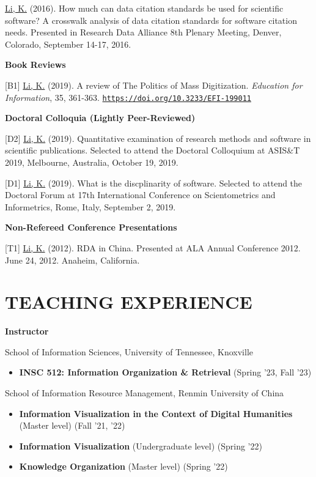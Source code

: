 \documentclass[margin, 10pt]{res} %
\begin{document}
\begin{resume}
[P1] \underline{Li, K.} (2016). How much can data citation standards be used for scientific software? A crosswalk analysis of data citation standards for software citation needs. Presented in Research Data Alliance 8th Plenary Meeting, Denver, Colorado, September 14-17, 2016.

\textbf{Book Reviews}

[B1] \underline{Li, K.} (2019). A review of The Politics of Mass Digitization. \textit{Education for Information}, 35, 361-363. \href{https://doi.org/10.3233/EFI-199011}{\nolinkurl{https://doi.org/10.3233/EFI-199011}}

\textbf{Doctoral Colloquia (Lightly Peer-Reviewed)}

[D2] \underline{Li, K.} (2019). Quantitative examination of research methods and software in scientific publications. Selected to attend the Doctoral Colloquium at ASIS\&T 2019, Melbourne, Australia, October 19, 2019.

[D1] \underline{Li, K.} (2019). What is the discplinarity of software. Selected to attend the Doctoral Forum at 17th International Conference on Scientometrics and Informetrics, Rome, Italy, September 2, 2019.

\textbf{Non-Refereed Conference Presentations}

[T1] \underline{Li, K.} (2012). RDA in China. Presented at ALA Annual Conference 2012. June 24, 2012. Anaheim, California.

\section{TEACHING EXPERIENCE}

\textbf{Instructor}

School of Information Sciences, University of Tennessee, Knoxville
\begin{itemize}
\item \textbf{INSC 512: Information Organization \& Retrieval} (Spring '23, Fall '23)
\end{itemize}

School of Information Resource Management, Renmin University of China
\begin{itemize}
\item \textbf{Information Visualization in the Context of Digital Humanities} (Master level) (Fall '21, '22)
\item \textbf{Information Visualization} (Undergraduate level) (Spring '22)
\item \textbf{Knowledge Organization} (Master level) (Spring '22)
\end{itemize}


\end{resume}
\end{document}
